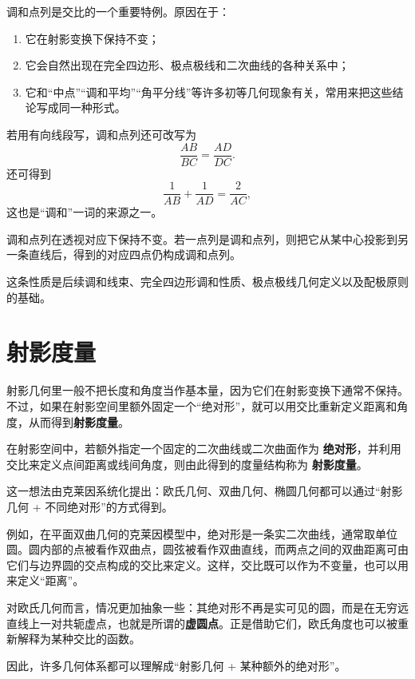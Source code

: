 调和点列是交比的一个重要特例。原因在于：

\begin{enumerate}
    \item 它在射影变换下保持不变；
    \item 它会自然出现在完全四边形、极点极线和二次曲线的各种关系中；
    \item 它和“中点”“调和平均”“角平分线”等许多初等几何现象有关，常用来把这些结论写成同一种形式。
\end{enumerate}

若用有向线段写，调和点列还可改写为
\[
\frac{AB}{BC}=\frac{AD}{DC}.
\]
还可得到
\[
\frac{1}{AB}+\frac{1}{AD}=\frac{2}{AC},
\]
这也是“调和”一词的来源之一。

\vspace{0.5em}
\begin{property}
调和点列在透视对应下保持不变。若一点列是调和点列，则把它从某中心投影到另一条直线后，得到的对应四点仍构成调和点列。
\end{property}

这条性质是后续调和线束、完全四边形调和性质、极点极线几何定义以及配极原则的基础。

\section{射影度量}
射影几何里一般不把长度和角度当作基本量，因为它们在射影变换下通常不保持。不过，如果在射影空间里额外固定一个“绝对形”，就可以用交比重新定义距离和角度，从而得到\textbf{射影度量}。

\begin{definition}
在射影空间中，若额外指定一个固定的二次曲线或二次曲面作为 \textbf{绝对形}，并利用交比来定义点间距离或线间角度，则由此得到的度量结构称为 \textbf{射影度量}。
\end{definition}

这一想法由克莱因系统化提出：欧氏几何、双曲几何、椭圆几何都可以通过“射影几何 + 不同绝对形”的方式得到。

例如，在平面双曲几何的克莱因模型中，绝对形是一条实二次曲线，通常取单位圆。圆内部的点被看作双曲点，圆弦被看作双曲直线，而两点之间的双曲距离可由它们与边界圆的交点构成的交比来定义。这样，交比既可以作为不变量，也可以用来定义“距离”。

对欧氏几何而言，情况更加抽象一些：其绝对形不再是实可见的圆，而是在无穷远直线上一对共轭虚点，也就是所谓的\textbf{虚圆点}。正是借助它们，欧氏角度也可以被重新解释为某种交比的函数。

\begin{remark}
因此，许多几何体系都可以理解成“射影几何 + 某种额外的绝对形”。
\end{remark}

